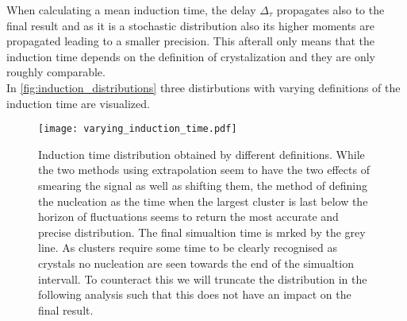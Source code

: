 When calculating a mean induction time, the delay $\Delta_{\tau}$ propagates also to the final result and as it is a stochastic distribution also its higher moments are propagated leading to a smaller precision. This afterall only means that the induction time depends on the definition of crystalization and they are only roughly comparable.\\ 
In \autoref{fig:induction_distributions} three distirbutions with varying definitions of the induction time are visualized.

\begin{figure}[!h]
\centering
\texttt{[image: varying\_induction\_time.pdf]}
\caption{Induction time distribution obtained by different definitions. While the two methods using extrapolation seem to have the two effects of smearing the signal as well as shifting them, the method of defining the nucleation as the time when the largest cluster is last below the horizon of fluctuations seems to return the most accurate and precise distribution. The final simualtion time is mrked by the grey line. As clusters require some time to be clearly recognised as crystals no nucleation are seen towards the end of the simualtion intervall. To counteract this we will truncate the distribution in the following analysis such that this does not have an impact on the final result.}
\label{fig:induction_distributions}
\end{figure}

